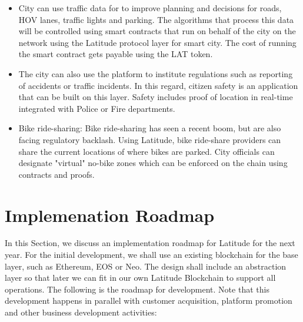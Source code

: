 \begin{itemize}
    \item City can use traffic data for to improve planning and decisions for roads, HOV lanes, traffic lights and
        parking. The algorithms that process this data will be controlled using smart contracts that run on behalf of
        the city on the network using the Latitude protocol layer for smart city. The cost of running the smart contract
        gets payable using the LAT token.
    \item The city can also use the platform to institute regulations such as reporting of accidents or traffic
        incidents. In this regard, citizen safety is an application that can be built on this layer. Safety includes
        proof of location in real-time integrated with Police or Fire departments.
    \item Bike ride-sharing: Bike ride-sharing has seen a recent boom, but are also facing regulatory backlash. Using
        Latitude, bike ride-share providers can share the current locations of where bikes are parked. City officials
        can designate "virtual" no-bike zones which can be enforced on the chain using contracts and proofs. 
\end{itemize}

%

\section{Implemenation Roadmap}
\label{sec:roadmap}

In this Section, we discuss an implementation roadmap for Latitude for the next year. For the initial development, we
shall use an existing blockchain for the base layer, such as Ethereum, EOS or Neo. The design shall include an
abstraction layer so that later we can fit in our own Latitude Blockchain to support all operations. The following is
the roadmap for development. Note that this development happens in parallel with customer acquisition, platform
promotion and other business development activities:

